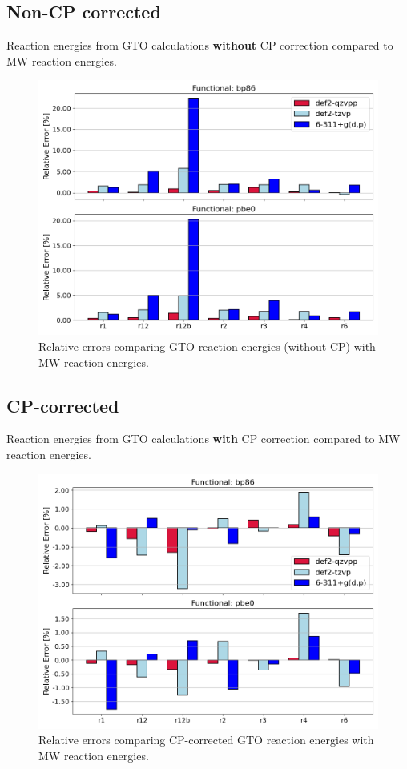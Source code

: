\documentclass[11pt,a4paper]{article}
\begin{document}
	\subsection{Non-CP corrected}
	Reaction energies from GTO calculations \textbf{without} CP correction compared to MW reaction energies.
	\begin{figure}[H]
		\centering
		\includegraphics[width = \textwidth]{../figs/old_gto_vs_mw_noncp.png}
		\caption{Relative errors comparing GTO reaction energies (without CP) with MW reaction energies.}
		\label{fig: }
	\end{figure}

	\subsection{CP-corrected}
	Reaction energies from GTO calculations \textbf{with} CP correction compared to MW reaction energies.
	\begin{figure}[H]
		\centering
		\includegraphics[width = \textwidth]{../figs/old_gto_vs_mw_cp.png}
		\caption{Relative errors comparing CP-corrected GTO reaction energies with MW reaction energies.}
		\label{fig: }
	\end{figure}
\end{document}
